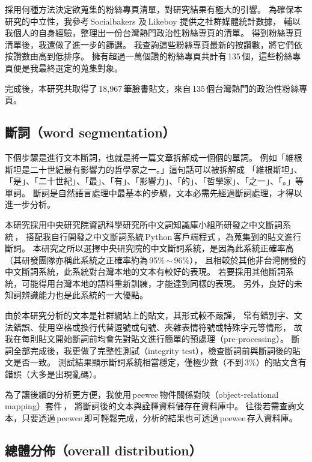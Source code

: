 \documentclass[letterpaper, 10pt, conference]{ieeeconf}   %
\begin{document}
\begin{CJK*}{UTF8}{bsmi}
採用何種方法決定欲蒐集的粉絲專頁清單，對研究結果有極大的引響。
為確保本研究的中立性，我參考\,Socialbakers\,\cite{c4}\,及\,Likeboy\,\cite{c5}\,提供之社群媒體統計數據，
輔以我個人的自身經驗，整理出一份台灣熱門政治性粉絲專頁的清單。
得到粉絲專頁清單後，我還做了進一步的篩選。
我查詢這些粉絲專頁最新的按讚數，將它們依按讚數由高到低排序。
擁有超過一萬個讚的粉絲專頁共計有\,135\,個，這些粉絲專頁便是我最終選定的蒐集對象。

完成後，本研究共取得了\,18,967\,筆臉書貼文，來自\,135\,個台灣熱門的政治性粉絲專頁。

\subsection*{斷詞（word segmentation）}

下個步驟是進行文本斷詞，也就是將一篇文章拆解成一個個的單詞。
例如「維根斯坦是二十世紀最有影響力的哲學家之一。」這句話可以被拆解成
「維根斯坦」、「是」、「二十世紀」、「最」、「有」、「影響力」、「的」、「哲學家」、「之一」、「。」等單詞。
斷詞是自然語言處理中最基本的步驟，文本必需先經過斷詞處理，才得以進一步分析。

本研究採用中央研究院資訊科學研究所中文詞知識庫小組所研發之中文斷詞系統\,\cite{c6}，
搭配我自行開發之中文斷詞系統\,Python\,客戶端程式\,\cite{c7}，為蒐集到的貼文進行斷詞。
本研究之所以選擇中央研究院的中文斷詞系統，是因為此系統正確率高（其研發團隊亦稱此系統之正確率約為\,95\%\,$\sim$\,96\%），
且相較於其他非台灣開發的中文斷詞系統，此系統對台灣本地的文本有較好的表現。
若要採用其他斷詞系統，可能得用台灣本地的語料重新訓練，才能達到同樣的表現。
另外，良好的未知詞辨識能力也是此系統的一大優點。

由於本研究分析的文本是社群網站上的貼文，其形式較不嚴謹，
常有錯別字、文法錯誤、使用空格或換行代替逗號或句號、夾雜表情符號或特殊字元等情形，
故我在每則貼文開始斷詞前均會先對貼文進行簡單的預處理（pre-processing）。
斷詞全部完成後，我更做了完整性測試（integrity test），檢查斷詞前與斷詞後的貼文是否一致。
測試結果顯示斷詞系統相當穩定，僅極少數（不到\,3\%）的貼文含有錯誤（大多是出現亂碼）。

為了讓後續的分析更方便，我使用\,peewee\,物件關係對映（object-relational mapping）套件\,\cite{c8}，
將斷詞後的文本與詮釋資料儲存在資料庫中。
往後若需查詢文本，只要透過\,peewee\,即可輕鬆完成，分析的結果也可透過\,peewee\,存入資料庫。

\subsection*{總體分佈（overall distribution）}


\end{CJK*}
\end{document}
